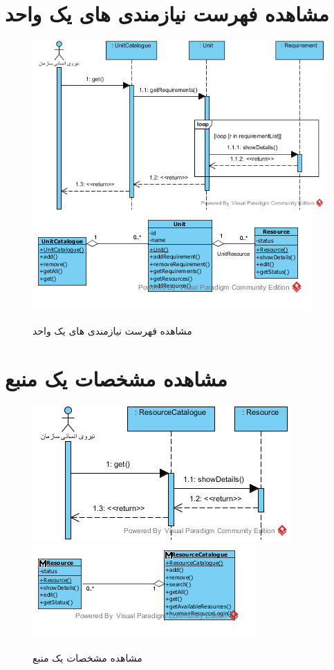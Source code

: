 \section{مشاهده فهرست نیازمندی های یک واحد}
\begin{figure}[H]
	\centering
	\includegraphics[scale=0.8]{img/sequence-analysis/ViewListOfRequirements}
	\includegraphics[scale=0.8]{img/sequence-analysis/ViewListOfRequirementsC}
	\caption{مشاهده فهرست نیازمندی های یک واحد}
\end{figure}


\section{مشاهده مشخصات یک منبع}
\begin{figure}[H]
	\centering
	\includegraphics[scale=0.7]{img/sequence-analysis/ViewResourceAttributes}
	\includegraphics[scale=0.7]{img/sequence-analysis/ViewResourceAttributesC}
	\caption{مشاهده مشخصات یک منبع}
\end{figure}

